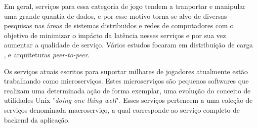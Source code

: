 Em geral, serviços para essa categoria de jogo tendem a tranportar e manipular uma grande quantia de dados, e por esse motivo torna-se alvo de diversas pesquisas nas áreas de sistemas distribuidos e redes de computadores com o objetivo de minimizar o impácto da latência nesses serviços\cite{stephenclarkewillson2017} e por sua vez aumentar a qualidade de serviço. Vários estudos focaram em distribuição de carga \cite{load_balance} \cite{kd_tree}, e arquiteturas \textit{peer-to-peer}.

Os serviços atuais escritos para suportar milhares de jogadores atualmente estão trabalhando como microserviços\cite{stephenclarkewillson2017}\cite{albion_online_unite}. Estes microserviços são pequenos softwares que realizam uma determinada ação de forma exemplar, uma evolução do conceito de utilidades Unix "\textit{doing one thing well}". Esses serviços pertencem a uma coleção de serviços denominada macroserviço, a qual corresponde ao serviço completo de backend da aplicação.
